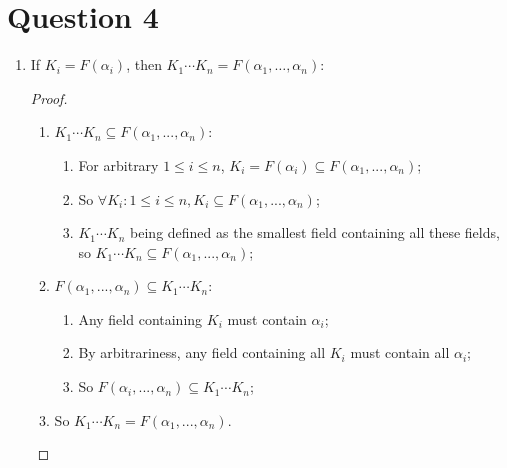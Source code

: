 \documentclass[12pt]{article}
\begin{document}
\section*{Question 4}
\begin{enumerate}
\item If $K_i=F(\alpha_i)$, then $K_1\cdots K_n=F(\alpha_1,\dots,\alpha_n)$:
\begin{proof}

~
    \begin{enumerate}
\item $K_1\cdots K_n\subseteq F(\alpha_1,...,\alpha_n)$:
\begin{enumerate}
    \item For arbitrary $1\leq i\leq n$, $K_i=F(\alpha_i)\subseteq F(\alpha_1,...,\alpha_n)$;
    \item So $\forall K_i:1\leq i\leq n,K_i\subseteq F(\alpha_1,...,\alpha_n)$;
    \item $K_1\cdots K_n$ being defined as the smallest field containing all these fields, so $K_1\cdots K_n\subseteq F(\alpha_1,...,\alpha_n)$;
\end{enumerate}
\item $F(\alpha_1,...,\alpha_n)\subseteq K_1\cdots K_n$:
\begin{enumerate}
    \item Any field containing $K_i$ must contain $\alpha_i$;
    \item By arbitrariness, any field containing all $K_i$ must contain all $\alpha_i$;
    \item So $F(\alpha_i,...,\alpha_n)\subseteq K_1\cdots K_n$;
\end{enumerate}
\item So $K_1\cdots K_n=F(\alpha_1,...,\alpha_n)$.
\end{enumerate}
\end{proof}


\end{enumerate}
\end{document}
